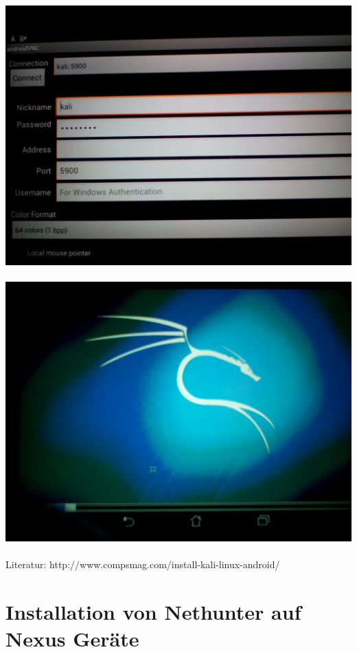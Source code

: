 \documentclass[11pt,a4paper]{article}
\begin{document}
\includegraphics[scale=0.09]{./Image/img7} \\ \\
\includegraphics[scale=0.09]{./Image/img8} \\ \\

Literatur: http://www.compsmag.com/install-kali-linux-android/

\section {Installation von Nethunter auf Nexus Geräte}
\end{document}
